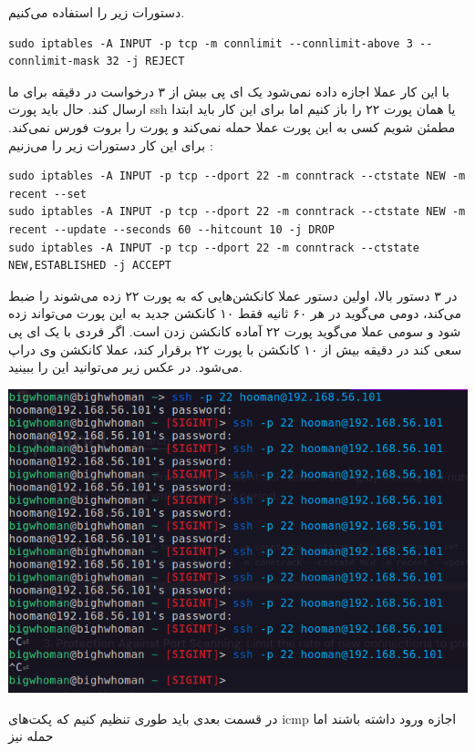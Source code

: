 دستورات زیر را استفاده می‌کنیم.
\begin{latin}   
\begin{lstlisting}
sudo iptables -A INPUT -p tcp -m connlimit --connlimit-above 3 --connlimit-mask 32 -j REJECT
\end{lstlisting}
\end{latin}
با این کار عملا اجازه داده نمی‌شود یک ای پی بیش از ۳ 
درخواست در دقیقه برای ما ارسال کند.
حال باید پورت ssh یا همان پورت ۲۲ را باز کنیم اما 
برای این کار باید ابتدا مطمئن شویم کسی به این پورت عملا حمله نمی‌کند و پورت را بروت فورس نمی‌کند. 
برای این کار دستورات زیر را می‌زنیم : 
\begin{latin}   
\begin{lstlisting}
sudo iptables -A INPUT -p tcp --dport 22 -m conntrack --ctstate NEW -m recent --set
sudo iptables -A INPUT -p tcp --dport 22 -m conntrack --ctstate NEW -m recent --update --seconds 60 --hitcount 10 -j DROP
sudo iptables -A INPUT -p tcp --dport 22 -m conntrack --ctstate NEW,ESTABLISHED -j ACCEPT
\end{lstlisting}
\end{latin}
در ۳ دستور بالا، اولین دستور عملا کانکشن‌هایی که به پورت ۲۲ زده می‌شوند را ضبط می‌کند، دومی می‌گوید در هر ۶۰ ثانیه فقط ۱۰ کانکشن جدید به این پورت می‌تواند زده شود و سومی عملا می‌گوید پورت ۲۲ آماده کانکشن زدن است.
اگر فردی با یک ای پی سعی کند در دقیقه بیش از 
۱۰ کانکشن با پورت ۲۲ برقرار کند، عملا کانکشن وی 
دراپ می‌شود. در عکس زیر می‌توانید این را ببینید.
\begin{center}
    \includegraphics[scale=0.30]{pics/iptables3.png}
\end{center}
در قسمت بعدی باید طوری تنظیم کنیم که پکت‌های icmp اجازه ورود داشته باشند اما حمله 
 نیز 
